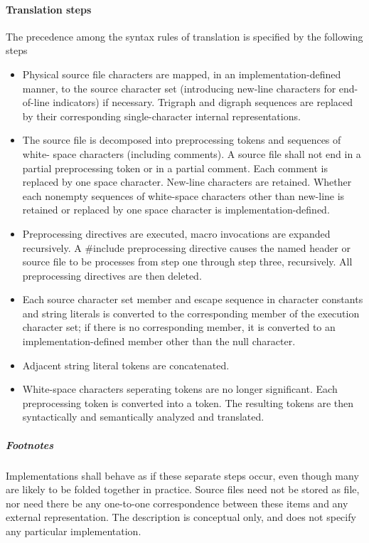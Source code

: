 \documentclass{article}
\begin{document}
\paragraph*{Translation steps}
The precedence among the syntax rules of translation is specified by the following steps
\begin{itemize}
	\item Physical source file characters are mapped, in an implementation-defined manner,
	      to the source character set (introducing new-line characters for end-of-line
	      indicators) if necessary.  Trigraph and digraph sequences are replaced by their
	      corresponding single-character internal representations.
	\item The source file is decomposed into preprocessing tokens and sequences of white-
	      space characters (including comments). A source file shall not end in a partial
	      preprocessing token or in a partial comment. Each comment is replaced by one
	      space character. New-line characters are retained. Whether each nonempty
	      sequences of white-space characters other than new-line is retained or replaced
	      by one space character is implementation-defined.
	\item Preprocessing directives are executed, macro invocations are expanded 
	      recursively. A \#include preprocessing directive causes the named header or
	      source file to be processes from step one through step three, recursively. All
	      preprocessing directives are then deleted.
	\item Each source character set member and escape sequence in character constants and
	      string literals is converted to the corresponding member of the execution
	      character set; if there is no corresponding member, it is converted to an
	      implementation-defined member other than the null character.
	\item Adjacent string literal tokens are concatenated.
	\item White-space characters seperating tokens are no longer significant. Each
	      preprocessing token is converted into a token. The resulting tokens are then
	      syntactically and semantically analyzed and translated.	    		      
\end{itemize}
\subparagraph*{Footnotes}
Implementations shall behave as if these separate steps occur, even though many are likely
to be folded together in practice. Source files need not be stored as file, nor need there
be any one-to-one correspondence between these items and any external representation. The
description is conceptual only, and does not specify any particular implementation.
\end{document}
